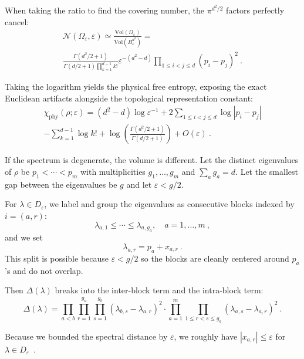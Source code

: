 \documentclass[aps,pre,twocolumn,superscriptaddress,amsmath,amssymb,reprint]{revtex4-2}
\def\eps{\varepsilon}
\begin{document}
When taking the ratio to find the covering number, the $\pi^{d^2/2}$ factors perfectly cancel:
\begin{multline}
    \mathcal{N}(\Omega_\eps, \eps) \simeq \frac{\mathrm{Vol}(\Omega_\eps)}{\mathrm{Vol}(B_\eps^{d^2})} =\\ \frac{\Gamma(d^2/2 + 1)}{\Gamma(d/2 + 1) \prod_{k=1}^{d-1} k!} \eps^{-(d^2-d)} \prod_{1\le i<j\le d}(p_i-p_j)^2\ .
\end{multline}


Taking the logarithm yields the physical free entropy, exposing the exact Euclidean artifacts alongside the topological representation constant:
\begin{multline}\label{eq:free_phys1_app}
    \chi_{\mathrm{phy}}(\rho; \eps) = (d^2-d)\log \eps^{-1} + 2\sum_{1\le i<j\le d} \log|p_i-p_j|\\ - \sum_{k=1}^{d-1} \log k! + \log \left( \frac{\Gamma(d^2/2 + 1)}{\Gamma(d/2 + 1)} \right) + O(\eps)\ .
\end{multline}

If the spectrum is degenerate, the volume is different. Let the distinct eigenvalues of $\rho$ be $p_1<\cdots<p_m$ with multiplicities $g_1,\ldots,g_m$ and $\sum_a g_a=d$. Let the smallest gap between the eigenvalues be $g$ and let $\eps<g/2$. 

For $\lambda\in D_\eps$, we label and group the eigenvalues as consecutive blocks indexed by $i=(a,r)$:
\begin{equation}
    \lambda_{a,1}\le\cdots\le\lambda_{a,g_a},\quad a=1,\ldots,m\ ,
\end{equation}
and we set
\begin{equation}
    \lambda_{a,r} = p_a+x_{a,r}\ .
\end{equation}
This split is possible because $\eps<g/2$ so the blocks are cleanly centered around $p_a$'s and do not overlap.

Then $\Delta(\lambda)$ breaks into the inter-block term and the intra-block term:
\begin{equation}
    \Delta(\lambda) = \prod_{a<b}\prod_{r=1}^{g_a}\prod_{s=1}^{g_b}(\lambda_{b,s}-\lambda_{a,r})^2\cdot
    \prod_{a=1}^m\prod_{1\le r<s\le g_a}(\lambda_{a,s}-\lambda_{a,r})^2\ .
\end{equation}

Because we bounded the spectral distance by $\eps$, we roughly have $|x_{a,r}|\le \eps$ for $\lambda\in D_\eps$\ .
\end{document}
